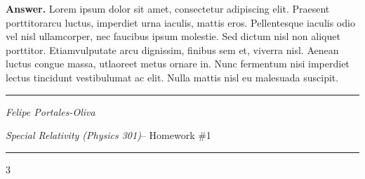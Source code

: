 \documentclass[13pt , a4paper]{article}
\begin{document}
\textbf{Answer.} Lorem ipsum dolor sit amet, consectetur adipiscing elit. Praesent porttitorarcu luctus, imperdiet urna iaculis, mattis eros. Pellentesque iaculis odio vel nisl ullamcorper, nec faucibus ipsum molestie. Sed dictum nisl non aliquet porttitor. Etiamvulputate arcu dignissim, finibus sem et, viverra nisl. Aenean luctus congue massa, utlaoreet metus ornare in. Nunc fermentum nisi imperdiet lectus tincidunt vestibulumat ac elit. Nulla mattis nisl eu malesuada suscipit.\\
\pagestyle{empty}
\vskip0.9mm
\hrule
\begin{flushright}
\textit{Felipe Portales-Oliva}
\end{flushright}
\newpage
\vskip5mm
\textit{Special Relativity (Physics 301)}– Homework \#1
\vskip1mm
\hrule
\begin{flushright}
\vskip-0.7cm
3
\end{flushright}
\vskip -1cm
\end{document}
